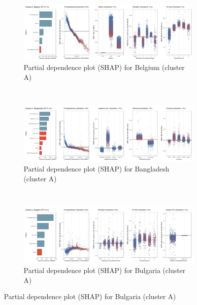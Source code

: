 \begin{figure}[ht!]\ContinuedFloat
    \centering
   \begin{subfigure}[b]{\textwidth}
   \centering
         \caption{Partial dependence plot (SHAP) for Belgium (cluster A)}
         \label{fig:5b_BEL}
         \includegraphics[width=\textwidth]{Figure 5b/Figure_5b_BEL}
         \end{subfigure}
    \\
    \vspace{0.5cm}
   \begin{subfigure}[b]{\textwidth}
   \centering
         \caption{Partial dependence plot (SHAP) for Bangladesh (cluster A)}
         \label{fig:5b_BGD}
         \includegraphics[width=\textwidth]{Figure 5b/Figure_5b_BGD} 
         \end{subfigure}
    \\
    \vspace{0.5cm}
   \begin{subfigure}[b]{\textwidth}
         \centering
         \caption{Partial dependence plot (SHAP) for Bulgaria (cluster A)}
         \label{fig:5b_BGR}
         \includegraphics[width=\textwidth]{Figure 5b/Figure_5b_BGR}     \end{subfigure}

\end{figure}
